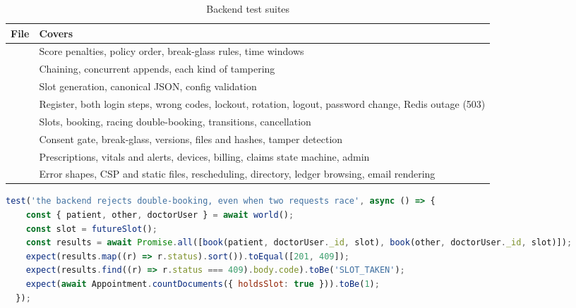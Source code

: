 \begin{table}[H]
\centering\small
\caption{Backend test suites}\label{tab:tests}
\begin{tabularx}{\textwidth}{@{}P{5cm}Y@{}}
\toprule
\textbf{File} & \textbf{Covers} \\
\midrule
{} & Score penalties, policy order, break-glass rules, time windows \\
 & Chaining, concurrent appends, each kind of tampering \\
 & Slot generation, canonical JSON, config validation \\
 & Register, both login steps, wrong codes, lockout, rotation, logout, password change, Redis outage (503) \\
 & Slots, booking, racing double-booking, transitions, cancellation \\
 & Consent gate, break-glass, versions, files and hashes, tamper detection \\
 & Prescriptions, vitals and alerts, devices, billing, claims state machine, admin \\
 & Error shapes, CSP and static files, rescheduling, directory, ledger browsing, email rendering \\
\bottomrule
\end{tabularx}
\end{table}

\begin{lstlisting}[language=JavaScript,caption={The double-booking race (\file{tests/integration/appointments.test.js})}]
  test('the backend rejects double-booking, even when two requests race', async () => {
    const { patient, other, doctorUser } = await world();
    const slot = futureSlot();
    const results = await Promise.all([book(patient, doctorUser._id, slot), book(other, doctorUser._id, slot)]);
    expect(results.map((r) => r.status).sort()).toEqual([201, 409]);
    expect(results.find((r) => r.status === 409).body.code).toBe('SLOT_TAKEN');
    expect(await Appointment.countDocuments({ holdsSlot: true })).toBe(1);
  });
\end{lstlisting}

